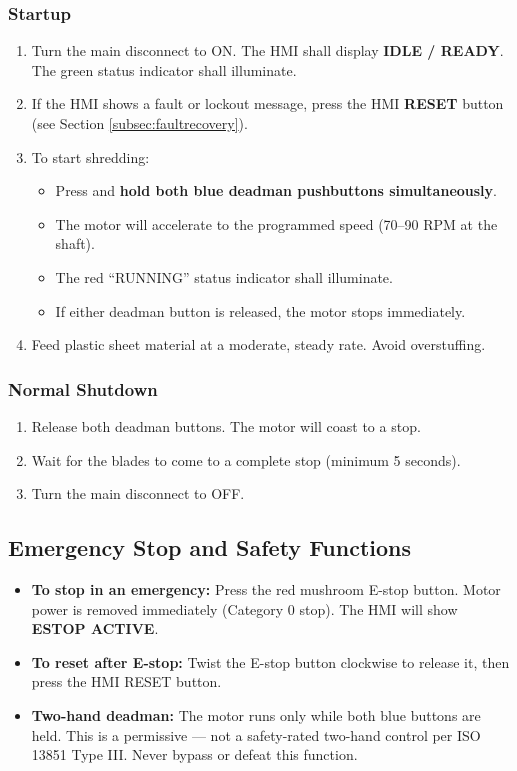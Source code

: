 \documentclass[hidelinks,12pt]{article}
\begin{document}
\subsubsection{Startup}
\begin{enumerate}
    \item Turn the main disconnect to ON. The HMI shall display \textbf{IDLE / READY}. The green status indicator shall illuminate.
    \item If the HMI shows a fault or lockout message, press the HMI \textbf{RESET} button (see Section \ref{subsec:faultrecovery}).
    \item To start shredding: 
        \begin{itemize}
            \item Press and \textbf{hold both blue deadman pushbuttons simultaneously}.
            \item The motor will accelerate to the programmed speed (70–90 RPM at the shaft).
            \item The red ``RUNNING'' status indicator shall illuminate.
            \item If either deadman button is released, the motor stops immediately.
        \end{itemize}
    \item Feed plastic sheet material at a moderate, steady rate. Avoid overstuffing.
\end{enumerate}

\subsubsection{Normal Shutdown}
\begin{enumerate}
    \item Release both deadman buttons. The motor will coast to a stop.
    \item Wait for the blades to come to a complete stop (minimum 5 seconds).
    \item Turn the main disconnect to OFF.
\end{enumerate}

\subsection{Emergency Stop and Safety Functions}
\begin{itemize}
    \item \textbf{To stop in an emergency:} Press the red mushroom E-stop button. Motor power is removed immediately (Category 0 stop). The HMI will show \textbf{ESTOP ACTIVE}.
    \item \textbf{To reset after E-stop:} Twist the E-stop button clockwise to release it, then press the HMI RESET button.
    \item \textbf{Two-hand deadman:} The motor runs only while both blue buttons are held. This is a permissive — not a safety-rated two-hand control per ISO 13851 Type III. Never bypass or defeat this function.
\end{itemize}
\end{document}
